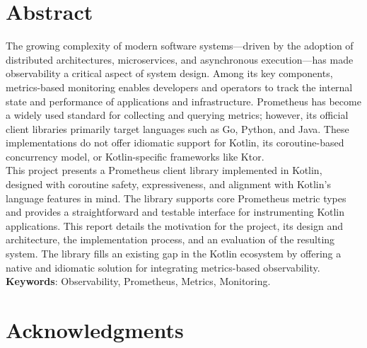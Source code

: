 \documentclass[a4paper,openright,twoside,11pt]{report}
\begin{document}
    \chapter*{Abstract}
    The growing complexity of modern software systems—driven by the adoption of distributed architectures, microservices, and asynchronous execution—has made observability a critical aspect of system design.
    Among its key components, metrics-based monitoring enables developers and operators to track the internal state and performance of applications and infrastructure.
    Prometheus has become a widely used standard for collecting and querying metrics; however, its official client libraries primarily target languages such as Go, Python, and Java.
    These implementations do not offer idiomatic support for Kotlin, its coroutine-based concurrency model, or
    Kotlin-specific frameworks like Ktor.\\

    This project presents a Prometheus client library implemented in Kotlin, designed with coroutine safety, expressiveness, and alignment with Kotlin's language features in mind.
    The library supports core Prometheus metric types and provides a straightforward and testable interface for instrumenting Kotlin applications.
    This report details the motivation for the project, its design and architecture, the implementation process, and an evaluation of the resulting system.
    The library fills an existing gap in the Kotlin ecosystem by offering a native and idiomatic solution for
    integrating metrics-based observability.\\

    {\textbf{Keywords}: Observability, Prometheus, Metrics, Monitoring.}

    \cleardoublepage
    \chapter*{Acknowledgments}
    \lipsum[1]

    \cleardoublepage
    \tableofcontents \cleardoublepage

    \listoffigures \cleardoublepage
    \listoftables \cleardoublepage
    \listofacronyms \cleardoublepage

    

    

    

    

    

    

    

    

    
    

    \appendix
    
\end{document}
